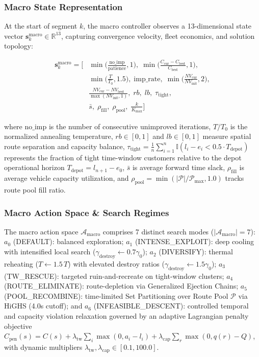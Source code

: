 \documentclass{ieeeaccess}
\begin{document}
\subsubsection{Macro State Representation}
At the start of segment $k$, the macro controller observes a 13-dimensional state vector $\mathbf{s}_k^{\text{macro}} \in \mathbb{R}^{13}$, capturing convergence velocity, fleet economics, and solution topology:

\begin{align}
  \mathbf{s}_k^{\text{macro}} = \Big[ 
    &\min\Big(\frac{\text{no\_imp}}{\text{patience}}, 1\Big), \; \min\Big(\frac{C_{\text{cur}} - C_{\text{best}}}{C_{\text{best}}}, 1\Big), \nonumber \\
    &\min\Big(\frac{T}{T_0}, 1.5\Big), \; \text{imp\_rate}, \; \min\Big(\frac{NV_{\text{cur}}}{NV_{\text{init}}}, 2\Big), \nonumber \\
    &\frac{NV_{\text{cur}} - NV_{\text{best}}}{\max(NV_{\text{init}}, 1)}, \; rb, \; lb, \; \tau_{\text{tight}}, \nonumber \\
    &\bar{s}, \; \rho_{\text{fill}}, \; \rho_{\text{pool}}, \; \frac{k}{K_{\max}} \Big]
  \label{eq:macro_state}
\end{align}

where $\text{no\_imp}$ is the number of consecutive unimproved iterations, $T/T_0$ is the normalized annealing temperature, $rb \in [0, 1]$ and $lb \in [0, 1]$ measure spatial route separation and capacity balance, $\tau_{\text{tight}} = \frac{1}{n}\sum_{i=1}^n \mathbb{I}(l_i - e_i < 0.5 \cdot T_{\text{depot}})$ represents the fraction of tight time-window customers relative to the depot operational horizon $T_{\text{depot}} = l_{n+1} - e_0$, $\bar{s}$ is average forward time slack, $\rho_{\text{fill}}$ is average vehicle capacity utilization, and $\rho_{\text{pool}} = \min(|\mathcal{P}|/\mathcal{P}_{\max}, 1.0)$ tracks route pool fill ratio.

\subsubsection{Macro Action Space \& Search Regimes}
The macro action space $\mathcal{A}_{\text{macro}}$ comprises 7 distinct search modes ($|\mathcal{A}_{\text{macro}}| = 7$): $a_0$ (\textsf{\small DEFAULT}): balanced exploration; $a_1$ (\textsf{\small INTENSE\_EXPLOIT}): deep cooling with intensified local search ($\gamma_{\text{destroy}} \leftarrow 0.7\gamma_0$); $a_2$ (\textsf{\small DIVERSIFY}): thermal reheating ($T \leftarrow 1.5\,T$) with elevated destroy ratios ($\gamma_{\text{destroy}} \leftarrow 1.5\gamma_0$); $a_3$ (\textsf{\small TW\_RESCUE}): targeted ruin-and-recreate on tight-window clusters; $a_4$ (\textsf{\small ROUTE\_ELIMINATE}): route-depletion via Generalized Ejection Chains; $a_5$ (\textsf{\small POOL\_RECOMBINE}): time-limited Set Partitioning over Route Pool $\mathcal{P}$ via HiGHS (4.0s cutoff); and $a_6$ (\textsf{\small INFEASIBLE\_DESCENT}): controlled temporal and capacity violation relaxation governed by an adaptive Lagrangian penalty objective $C_{\text{pen}}(s) = C(s) + \lambda_{\text{tw}} \sum_{i} \max(0, a_i - l_i) + \lambda_{\text{cap}} \sum_{r} \max(0, q(r) - Q)$, with dynamic multipliers $\lambda_{\text{tw}}, \lambda_{\text{cap}} \in [0.1, 100.0]$.
\end{document}

